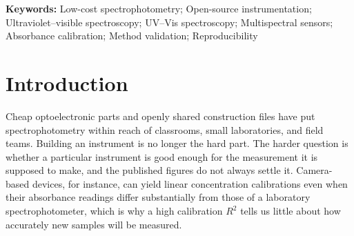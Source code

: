 \begin{abstract}
We examined 111 studies, published from 2012 onward, that describe low-cost ultraviolet, visible, or near-infrared spectrophotometers, and traced how optical design, calibration, validation, cost, and openness vary across six hardware families. Just under half of these studies tested their instruments on samples that had not been used for calibration, a similar share reported how repeatable the readings were, and only about a quarter shared design files or code. Since the studies measured different targets, evaluated them in different ways, and counted costs differently, they cannot be used to rank the hardware families against one another. To complement the literature, we compared three instruments with a laboratory spectrophotometer under a single protocol: an AS7265x multispectral sensor (system A), a Raspberry Pi camera behind a pocket grating spectroscope (system B), and a commercial webcam grating spectrometer (system C). On three food-dye solutions kept out of calibration fitting and model selection, the root-mean-square absorbance differences over 400--700~nm were 0.281, 0.077, and 0.094, respectively. These figures describe the particular units and acquisition procedures we tested. We end with an application-dependent reporting checklist meant to help readers decide whether a low-cost instrument suits a given measurement, and to help others rebuild it.
\end{abstract}

\noindent\textbf{Keywords:} Low-cost spectrophotometry; Open-source instrumentation; Ultraviolet--visible spectroscopy; UV--Vis spectroscopy; Multispectral sensors; Absorbance calibration; Method validation; Reproducibility

\section{Introduction}\label{sec:intro}

Cheap optoelectronic parts and openly shared construction files have put spectrophotometry within reach of classrooms, small laboratories, and field teams.\citep{pereira2019low,laganovska2020portable,feng2021open} Building an instrument is no longer the hard part. The harder question is whether a particular instrument is good enough for the measurement it is supposed to make, and the published figures do not always settle it. Camera-based devices, for instance, can yield linear concentration calibrations even when their absorbance readings differ substantially from those of a laboratory spectrophotometer,\citep{grasse2015teaching,bruininks2022inexpensive} which is why a high calibration $R^2$ tells us little about how accurately new samples will be measured.\citep{prairie2020accurate,cirrone2026analytical}

